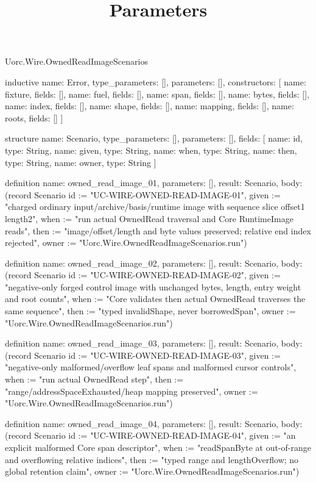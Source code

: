 \begin{lexlean}{Uorc.Wire.OwnedReadImageScenarios}
\title{Parameters}
\begin{semanticmodule}
inductive{
  name: Error,
  type_parameters: [],
  parameters: [],
  constructors: [
    {name: fixture, fields: []},
    {name: fuel, fields: []},
    {name: span, fields: []},
    {name: bytes, fields: []},
    {name: index, fields: []},
    {name: shape, fields: []},
    {name: mapping, fields: []},
    {name: roots, fields: []}
  ]
}

structure{
  name: Scenario,
  type_parameters: [],
  parameters: [],
  fields: [
    {name: id, type: String},
    {name: given, type: String},
    {name: when, type: String},
    {name: then, type: String},
    {name: owner, type: String}
  ]
}

definition{
  name: owned_read_image_01,
  parameters: [],
  result: Scenario,
  body: (record Scenario {id := "UC-WIRE-OWNED-READ-IMAGE-01", given := "charged ordinary input/archive/basis/runtime image with sequence slice offset1 length2", when := "run actual OwnedRead traversal and Core RuntimeImage reads", then := "image/offset/length and byte values preserved; relative end index rejected", owner := "Uorc.Wire.OwnedReadImageScenarios.run"})
}

definition{
  name: owned_read_image_02,
  parameters: [],
  result: Scenario,
  body: (record Scenario {id := "UC-WIRE-OWNED-READ-IMAGE-02", given := "negative-only forged control image with unchanged bytes, length, entry weight and root counts", when := "Core validates then actual OwnedRead traverses the same sequence", then := "typed invalidShape, never borrowedSpan", owner := "Uorc.Wire.OwnedReadImageScenarios.run"})
}

definition{
  name: owned_read_image_03,
  parameters: [],
  result: Scenario,
  body: (record Scenario {id := "UC-WIRE-OWNED-READ-IMAGE-03", given := "negative-only malformed/overflow leaf spans and malformed cursor controls", when := "run actual OwnedRead step", then := "range/addressSpaceExhausted/heap mapping preserved", owner := "Uorc.Wire.OwnedReadImageScenarios.run"})
}

definition{
  name: owned_read_image_04,
  parameters: [],
  result: Scenario,
  body: (record Scenario {id := "UC-WIRE-OWNED-READ-IMAGE-04", given := "an explicit malformed Core span descriptor", when := "readSpanByte at out-of-range and overflowing relative indices", then := "typed range and lengthOverflow; no global retention claim", owner := "Uorc.Wire.OwnedReadImageScenarios.run"})
}


\end{semanticmodule}
\end{lexlean}
